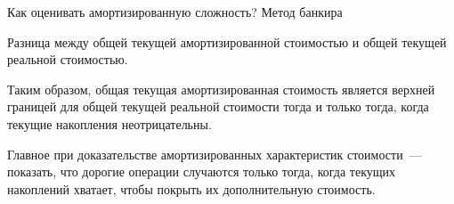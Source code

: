 \begin{frame}{Как оценивать амортизированную сложность? Метод банкира}
\begin{definition}
Разница между общей текущей амортизированной стоимостью
и общей текущей реальной стоимостью.
\end{definition}
\vspace{2em}
Таким образом, общая
текущая амортизированная стоимость является верхней границей для
общей текущей реальной стоимости тогда и только тогда, когда текущие
накопления неотрицательны.
\vspace{2em}

 Главное при доказательстве
амортизированных характеристик стоимости~--- показать, что дорогие
операции случаются только тогда, когда текущих накоплений хватает,
чтобы покрыть их дополнительную стоимость.

\end{frame}


%



%


